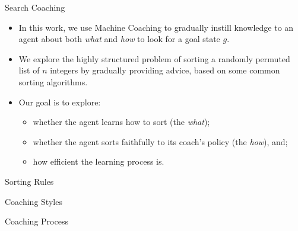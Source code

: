 \documentclass[aspectratio=169]{beamer}
\begin{document}
\begin{frame}{Search Coaching}
    \begin{itemize}[<+->]
        \item In this work, we use Machine Coaching to gradually instill knowledge to an agent about both \emph{what} and \emph{how} to look for a goal state $g$.
        \item We explore the highly structured problem of sorting a randomly permuted list of $n$ integers by gradually providing advice, based on some common sorting algorithms.
        \item Our goal is to explore:
        \begin{itemize}[<+->]
	        \item whether the agent learns how to sort (the \emph{what});
        	\item whether the agent sorts faithfully to its coach's policy (the \emph{how}), and;
        	\item how efficient the learning process is.
        \end{itemize}
    \end{itemize}
\end{frame}

\begin{frame}{Sorting Rules}
    \centering
    
\end{frame}


\begin{frame}{Coaching Styles}
    \centering
    
\end{frame}

\begin{frame}[fragile]{Coaching Process}
\end{frame}
\end{document}
